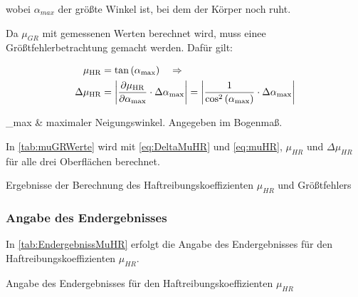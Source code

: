 wobei $\alpha_{max}$ der größte Winkel ist, bei dem der Körper noch ruht.\newline

Da $\mu_{GR}$ mit gemessenen Werten berechnet wird, muss einee Größtfehlerbetrachtung gemacht werden. Dafür gilt:


\begin{align}
\mu_{\mathrm{HR}} &=\tan \left(\alpha_{\max }\right) \quad \Rightarrow \nonumber \\
\Delta \mu_{\mathrm{HR}}&=\left|\frac{\partial \mu_{\mathrm{HR}}}{\partial \alpha_{\max }} \cdot \Delta \alpha_{\max }\right|=\abs*{\frac{1}{\cos ^{2}\left(\alpha_{\max }\right)} \cdot \Delta \alpha_{\max }} \label{eq:DeltaMuHR}
\end{align}
\begin{conditions}
\alpha_{max} & maximaler Neigungswinkel. Angegeben im Bogenmaß.
\end{conditions}

In \autoref{tab:muGRWerte} wird mit \autoref{eq:DeltaMuHR} und \autoref{eq:muHR}, $\mu_{HR}$ und $\Delta \mu_{HR}$ für alle drei Oberflächen berechnet.

\begin{table}[h]
  \center 
  \caption[Haftreibungskoeffizienten und Größtfehler]{Ergebnisse der Berechnung des Haftreibungskoeffizienten $\mu_{HR}$ und Größtfehlers}
  
  \label{tab:muGRWerte}
\end{table}

\subsubsection{Angabe des Endergebnisses}

In \autoref{tab:EndergebnissMuHR} erfolgt die Angabe des Endergebnisses für den Haftreibungskoeffizienten $\mu_{HR}$.

\begin{table}[h]
  \center 
  \caption[Endergebnisse des Haftreibungskoeffizienten]{Angabe des Endergebnisses für den Haftreibungskoeffizienten $\mu_{HR}$}
  
  \label{tab:EndergebnissMuHR}
\end{table}